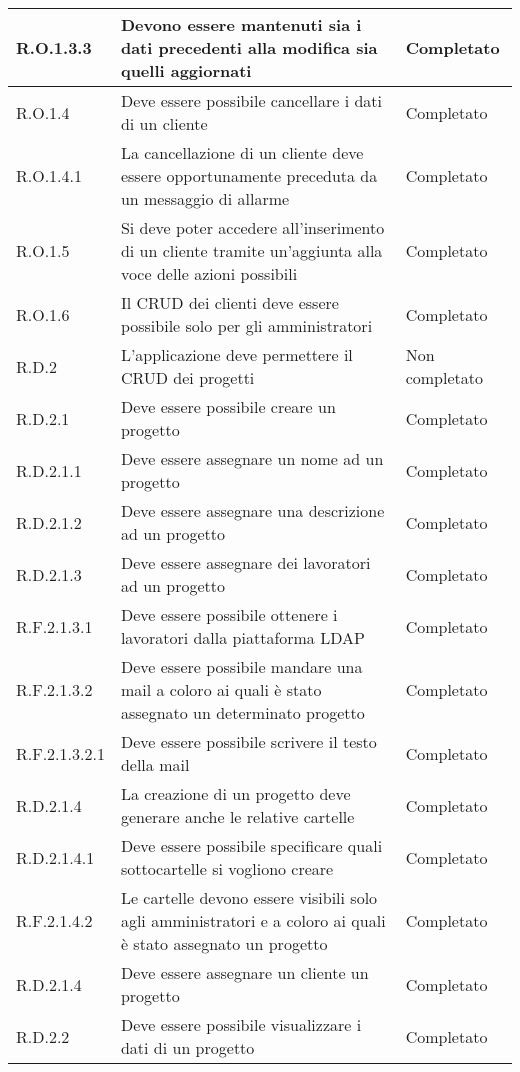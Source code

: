 \begin{longtable}{p{} p{} p{}}
\hline
R.O.1.3.3  & Devono essere mantenuti sia i dati precedenti alla modifica sia quelli aggiornati & Completato \\
\hline
R.O.1.4  & Deve essere possibile cancellare i dati di un cliente & Completato \\
\hline
R.O.1.4.1  & La cancellazione di un cliente deve essere opportunamente preceduta da un messaggio di allarme & Completato \\
\hline
R.O.1.5  & Si deve poter accedere all'inserimento di un cliente tramite un'aggiunta alla voce delle azioni possibili & Completato \\
\hline
R.O.1.6    & Il CRUD dei clienti deve essere possibile solo per gli amministratori & Completato \\
\hline
R.D.2    & L'applicazione deve permettere il CRUD dei progetti & Non completato \\
\hline
R.D.2.1    & Deve essere possibile creare un progetto & Completato \\
\hline
R.D.2.1.1    & Deve essere assegnare un nome ad un progetto & Completato \\
\hline
R.D.2.1.2    & Deve essere assegnare una descrizione ad un progetto & Completato \\
\hline
R.D.2.1.3    & Deve essere assegnare dei lavoratori ad un progetto & Completato \\
\hline
R.F.2.1.3.1    & Deve essere possibile ottenere i lavoratori dalla piattaforma LDAP & Completato \\
\hline
R.F.2.1.3.2   & Deve essere possibile mandare una mail a coloro ai quali è stato assegnato un determinato progetto & Completato \\
\hline
R.F.2.1.3.2.1   & Deve essere possibile scrivere il testo della mail & Completato \\
\hline
R.D.2.1.4  & La creazione di un progetto deve generare anche le relative cartelle & Completato \\
\hline
R.D.2.1.4.1  & Deve essere possibile specificare quali sottocartelle si vogliono creare & Completato \\
\hline
R.F.2.1.4.2  & Le cartelle devono essere visibili solo agli amministratori e a coloro ai quali è stato assegnato un progetto & Completato \\
\hline
R.D.2.1.4  & Deve essere assegnare un cliente un progetto & Completato \\
\hline
R.D.2.2    & Deve essere possibile visualizzare i dati di un progetto &Completato \\

\end{longtable}
